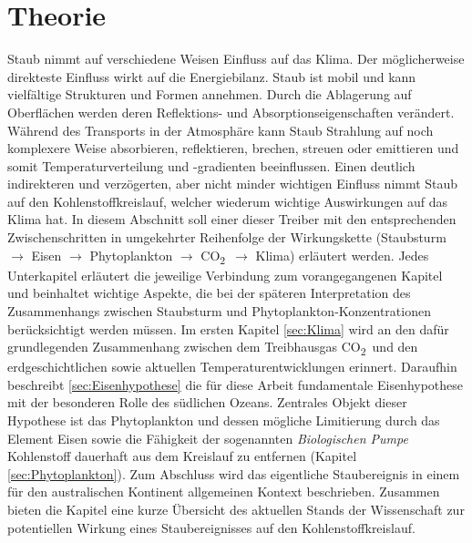 \documentclass[12pt,a4paper,onecolumn,draft]{scrartcl}
\newcommand{\cotwo}{CO\textsubscript{2}}
\begin{document}
\section{Theorie} \label{sec:Theorie}
Staub nimmt auf verschiedene Weisen Einfluss auf das Klima. Der möglicherweise direkteste Einfluss wirkt auf die Energiebilanz. Staub ist mobil und kann vielfältige Strukturen und Formen annehmen. Durch die Ablagerung auf Oberflächen werden deren Reflektions- und Absorptionseigenschaften verändert. Während des Transports in der Atmosphäre kann Staub Strahlung auf noch komplexere Weise absorbieren, reflektieren, brechen, streuen oder emittieren \citep{Shao.2011} und somit Temperaturverteilung und -gradienten beeinflussen. Einen deutlich indirekteren und verzögerten, aber nicht minder wichtigen Einfluss nimmt Staub auf den Kohlenstoffkreislauf, welcher wiederum wichtige Auswirkungen auf das Klima hat. In diesem Abschnitt soll einer dieser Treiber mit den entsprechenden Zwischenschritten in umgekehrter Reihenfolge der Wirkungskette (Staubsturm $\rightarrow$ Eisen $\rightarrow$ Phytoplankton $\rightarrow$ \cotwo \ $\rightarrow$ Klima) erläutert werden. Jedes Unterkapitel erläutert die jeweilige Verbindung zum vorangegangenen Kapitel und beinhaltet wichtige Aspekte, die bei der späteren Interpretation des Zusammenhangs zwischen Staubsturm und Phytoplankton-Konzentrationen berücksichtigt werden müssen. Im ersten Kapitel \ref{sec:Klima} wird an den dafür grundlegenden Zusammenhang zwischen dem Treibhausgas \cotwo \ und den erdgeschichtlichen sowie aktuellen Temperaturentwicklungen erinnert. Daraufhin beschreibt \ref{sec:Eisenhypothese} die für diese Arbeit fundamentale Eisenhypothese mit der besonderen Rolle des südlichen Ozeans. Zentrales Objekt dieser Hypothese ist das Phytoplankton und dessen mögliche Limitierung durch das Element Eisen sowie die Fähigkeit der sogenannten \textit{Biologischen Pumpe} Kohlenstoff dauerhaft aus dem Kreislauf zu entfernen (Kapitel \ref{sec:Phytoplankton}). Zum Abschluss wird das eigentliche Staubereignis in einem für den australischen Kontinent allgemeinen Kontext beschrieben. Zusammen bieten die Kapitel eine kurze Übersicht des aktuellen Stands der Wissenschaft zur potentiellen Wirkung eines Staubereignisses auf den Kohlenstoffkreislauf.
\end{document}
